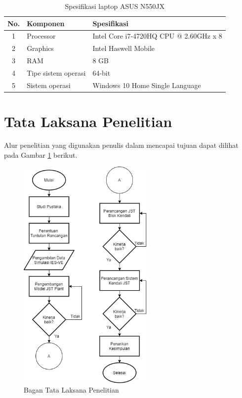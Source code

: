 \vspace{2em}
\begin{table}[!h]
	\caption{Spesifikasi laptop ASUS N550JX}
	\label{tbl:4:speklaptop}
	\centering
	\begin{tabular}{|c|p{5cm}|p{8cm}|}
		\hline
		No. & Komponen & Spesifikasi \\ \hline
		1 & Processor & Intel Core i7-4720HQ CPU @ 2.60GHz x 8 \\ \hline
		2 & Graphics & Intel Haswell Mobile \\ \hline
		3 & RAM & 8 GB \\ \hline
		4 & Tipe sistem operasi & 64-bit \\ \hline
		5 & Sistem operasi & Windows 10 Home Single Language \\ \hline
	\end{tabular}
\end{table}

\vspace{2em}
\section{Tata Laksana Penelitian}
Alur penelitian yang digunakan penulis dalam mencapai tujuan dapat dilihat pada Gambar \ref{fig:4:TataLaksanaPenelitian} berikut.
\begin{figure}[!h]
	\centering
	\includegraphics[width=0.6\textwidth]{figures/TataLaksanaPenelitian}
	\caption{Bagan Tata Laksana Penelitian}
	\label{fig:4:TataLaksanaPenelitian}
\end{figure}

